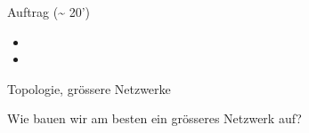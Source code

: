 \begin{frame}{Auftrag (\textasciitilde{} 20')}
    \begin{itemize}
        \item {}
        \item {}
    \end{itemize}
\end{frame}

\begin{frame}{Topologie, grössere Netzwerke}
    \begin{center}
        Wie bauen wir am besten ein grösseres Netzwerk auf?
    \end{center}

    

\end{frame}

